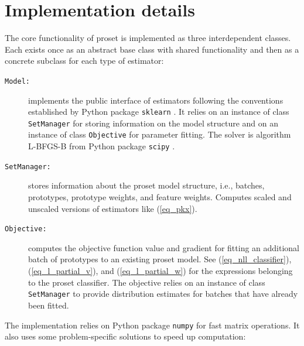 \section{Implementation details}
\label{sec_implementation}
%
The core functionality of proset is implemented as three interdependent classes.
Each exists once as an abstract base class with shared functionality and then as a concrete subclass for each type of estimator:
%
\begin{description}
\item[\texttt{Model:}] implements the public interface of estimators following the conventions established by Python package \texttt{sklearn} \cite{Pedregosa_11}.
It relies on an instance of class \texttt{SetManager} for storing information on the model structure and on an instance of class \texttt{Objective} for parameter fitting.
The solver is algorithm L-BFGS-B \cite{Byrd_95} from Python package \texttt{scipy} \cite{Virtanen_20}.
%
\item[\texttt{SetManager:}] stores information about the proset model structure, i.e., batches, prototypes, prototype weights, and feature weights.
Computes scaled and unscaled versions of estimators like (\ref{eq_pkx}).
%
\item[\texttt{Objective:}] computes the objective function value and gradient for fitting an additional batch of prototypes to an existing proset model.
See (\ref{eq_nll_classifier}), (\ref{eq_l_partial_v}), and (\ref{eq_l_partial_w}) for the expressions belonging to the proset classifier.
The objective relies on an instance of class \texttt{SetManager} to provide distribution estimates for batches that have already been fitted.
\end{description}
%
The implementation relies on Python package \texttt{numpy} \cite{Harris_20} for fast matrix operations.
It also uses some problem-specific solutions to speed up computation:
%
